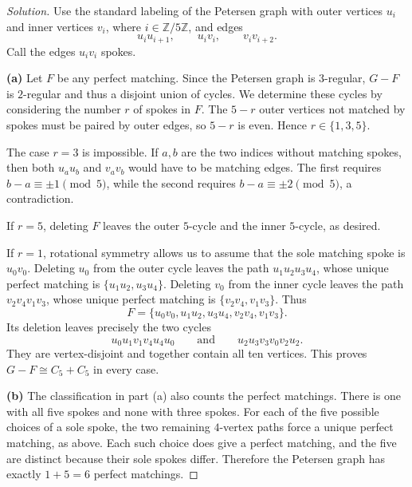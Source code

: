\documentclass[12pt]{amsart}
\newenvironment{solution}{\begin{proof}[Solution]}{\end{proof}}
\begin{document}
    \begin{solution}
        Use the standard labeling of the Petersen graph with outer
        vertices $u_i$ and inner vertices $v_i$, where
        $i\in\mathbb Z/5\mathbb Z$, and edges
        \[
            u_iu_{i+1},\qquad u_iv_i,\qquad v_iv_{i+2}.
        \]
        Call the edges $u_iv_i$ spokes.

        \smallskip
        \noindent\textbf{(a)} Let $F$ be any perfect matching.
        Since the Petersen graph is $3$-regular, $G-F$ is
        $2$-regular and thus a disjoint union of cycles.
        We determine these cycles by considering the number $r$
        of spokes in $F$. The $5-r$ outer vertices not matched by
        spokes must be paired by outer edges, so $5-r$ is even.
        Hence $r\in\{1,3,5\}$.

        The case $r=3$ is impossible. If $a,b$ are the two indices
        without matching spokes, then both $u_au_b$ and $v_av_b$
        would have to be matching edges. The first requires
        $b-a\equiv\pm1\pmod 5$, while the second requires
        $b-a\equiv\pm2\pmod 5$, a contradiction.

        If $r=5$, deleting $F$ leaves the outer $5$-cycle and the
        inner $5$-cycle, as desired.

        If $r=1$, rotational symmetry allows us to assume that
        the sole matching spoke is $u_0v_0$. Deleting $u_0$ from
        the outer cycle leaves the path $u_1u_2u_3u_4$, whose
        unique perfect matching is $\{u_1u_2,u_3u_4\}$.
        Deleting $v_0$ from the inner cycle leaves the path
        $v_2v_4v_1v_3$, whose unique perfect matching is
        $\{v_2v_4,v_1v_3\}$. Thus
        \[
            F=\{u_0v_0,u_1u_2,u_3u_4,v_2v_4,v_1v_3\}.
        \]
        Its deletion leaves precisely the two cycles
        \[
            u_0u_1v_1v_4u_4u_0
            \qquad\text{and}\qquad
            u_2u_3v_3v_0v_2u_2.
        \]
        They are vertex-disjoint and together contain all ten
        vertices. This proves $G-F\cong C_5+C_5$ in every case.

        \smallskip
        \noindent\textbf{(b)} The classification in part (a) also
        counts the perfect matchings. There is one with all five
        spokes and none with three spokes. For each of the five
        possible choices of a sole spoke, the two remaining
        $4$-vertex paths force a unique perfect matching, as above.
        Each such choice does give a perfect matching, and the five
        are distinct because their sole spokes differ. Therefore
        the Petersen graph has exactly $1+5=6$ perfect
        matchings.
    \end{solution}
\end{document}
